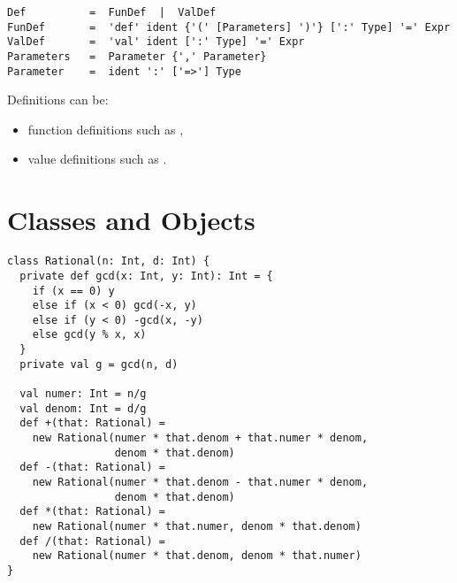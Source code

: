 \begin{itemize}

\begin{lstlisting}
Def          =  FunDef  |  ValDef
FunDef       =  'def' ident {'(' [Parameters] ')'} [':' Type] '=' Expr
ValDef       =  'val' ident [':' Type] '=' Expr
Parameters   =  Parameter {',' Parameter}
Parameter    =  ident ':' ['=>'] Type
\end{lstlisting}
Definitions can be:
\begin{itemize}
\item
function definitions such as ,
\item
value definitions such as .
\end{itemize}

\chapter{Classes and Objects}
\label{chap:classes}


\begin{lstlisting}
class Rational(n: Int, d: Int) {
  private def gcd(x: Int, y: Int): Int = {
    if (x == 0) y
    else if (x < 0) gcd(-x, y)
    else if (y < 0) -gcd(x, -y)
    else gcd(y % x, x)
  }
  private val g = gcd(n, d)

  val numer: Int = n/g
  val denom: Int = d/g
  def +(that: Rational) =
    new Rational(numer * that.denom + that.numer * denom,
                 denom * that.denom)
  def -(that: Rational) =
    new Rational(numer * that.denom - that.numer * denom, 
                 denom * that.denom)
  def *(that: Rational) =
    new Rational(numer * that.numer, denom * that.denom)
  def /(that: Rational) =
    new Rational(numer * that.denom, denom * that.numer)
}
\end{lstlisting}


\end{itemize}

